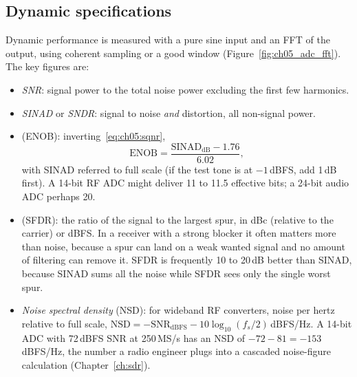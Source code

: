 
\subsection{Dynamic specifications}

Dynamic performance is measured with a pure sine input and an FFT of the output, using coherent
sampling or a good window (Figure~\ref{fig:ch05_adc_fft}). The key figures are:
\begin{itemize}
\item \emph{SNR}: signal power to the total noise power excluding the first few harmonics.
\item \emph{SINAD} or \emph{SNDR}: signal to noise \emph{and} distortion, all non-signal power.
\item {} (ENOB): inverting~\eqref{eq:ch05:sqnr},
\begin{equation}
\text{ENOB}=\frac{\text{SINAD}_{\text{dB}}-1.76}{6.02},
\label{eq:ch05:enob}
\end{equation}
with SINAD referred to full scale (if the test tone is at $-1$\,dBFS, add 1\,dB first). A 14-bit
RF ADC might deliver 11 to 11.5 effective bits; a 24-bit audio ADC perhaps 20.
\item {} (SFDR): the ratio of the signal to the largest spur,
in dBc (relative to the carrier) or dBFS. In a receiver with a strong blocker it often matters
more than noise, because a spur can land on a weak wanted signal and no amount of filtering
can remove it. SFDR is frequently 10 to 20\,dB better than SINAD, because SINAD sums all the
noise while SFDR sees only the single worst spur.
\item \emph{Noise spectral density} (NSD): for wideband RF converters, noise per hertz relative to
full scale, $\mathrm{NSD}=-\mathrm{SNR}_{\text{dBFS}}-10\log_{10}(f_s/2)$\,dBFS/Hz. A 14-bit ADC with
72\,dBFS SNR at 250\,MS/s has an NSD of $-72-81=-153$\,dBFS/Hz, the number a radio engineer
plugs into a cascaded noise-figure calculation (Chapter~\ref{ch:sdr}).
\end{itemize}



